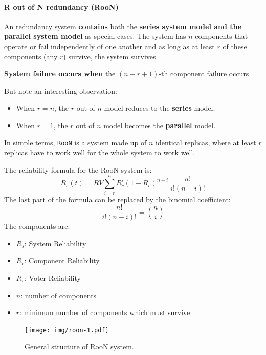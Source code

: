 \newpage

\paragraph{R out of N redundancy (RooN)}

An  redundancy system \textbf{contains} both the \textbf{series system model and the parallel system model} as special cases. The system has $n$ components that operate or fail independently of one another and as long as at least $r$ of these components (any $r$) survive, the system survives.\cite{nist8184Model}

\highspace
\textbf{System failure occurs when} the $\left(n - r + 1\right)$-th component failure occurs.\cite{nist8184Model}

\highspace
But note an interesting observation:\cite{nist8184Model}
\begin{itemize}
    \item When $r=n$, the $r$ out of $n$ model reduces to the \textbf{series} model.
    \item When $r=1$, the $r$ out of $n$ model becomes the \textbf{parallel} model.
\end{itemize}

\highspace
In simple terms, \texttt{RooN} is a system made up of $n$ identical replicas, where at least $r$ replicas have to work well for the whole system to work well.

\highspace
The reliability formula for the RooN system is:
\begin{equation}
	R_{s}\left(t\right) = RV \displaystyle\sum_{i=r}^{n} R_{c}^{i} \left(1 - R_{c}\right)^{n-i} \: \dfrac{n!}{i!\left(n-i\right)!}
\end{equation}
The last part of the formula can be replaced by the binomial coefficient:
\begin{equation*}
	\dfrac{n!}{i!\left(n-i\right)!} = \binom{n}{i}
\end{equation*}
The components are:
\begin{multicols}{2}
	\begin{itemize}
		\item $R_{s}$: System Reliability
		
		\item $R_{c}$: Component Reliability
		
		\item $R_{v}$: Voter Reliability
		
		\item $n$: number of components
		
		\item $r$: minimum number of components which must survive
	\end{itemize}
\end{multicols}
\begin{figure}[!htp]
	\centering
	\texttt{[image: img/roon-1.pdf]}
	\caption{General structure of RooN system.}
\end{figure}

